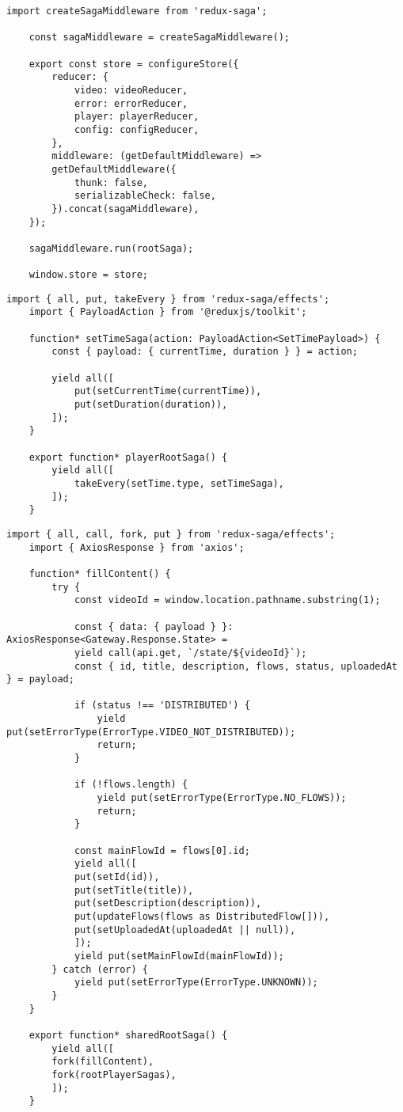 \begin{lstlisting}[caption={store.ts}]
	import createSagaMiddleware from 'redux-saga';
	
	const sagaMiddleware = createSagaMiddleware();
	
	export const store = configureStore({
		reducer: {
			video: videoReducer,
			error: errorReducer,
			player: playerReducer,
			config: configReducer,
		},
		middleware: (getDefaultMiddleware) =>
		getDefaultMiddleware({
			thunk: false,
			serializableCheck: false,
		}).concat(sagaMiddleware),
	});
	
	sagaMiddleware.run(rootSaga);
	
	window.store = store;
\end{lstlisting}

\begin{lstlisting}[caption={player/sagas.ts}]
	import { all, put, takeEvery } from 'redux-saga/effects';
	import { PayloadAction } from '@reduxjs/toolkit';
	
	function* setTimeSaga(action: PayloadAction<SetTimePayload>) {
		const { payload: { currentTime, duration } } = action;    
		
		yield all([
			put(setCurrentTime(currentTime)),
			put(setDuration(duration)),
		]);
	}
	
	export function* playerRootSaga() {
		yield all([
			takeEvery(setTime.type, setTimeSaga),
		]);
	}
\end{lstlisting}

\begin{lstlisting}[caption={shared/sagas.ts}]
	import { all, call, fork, put } from 'redux-saga/effects';
	import { AxiosResponse } from 'axios';
	
	function* fillContent() {
		try {
			const videoId = window.location.pathname.substring(1);
			
			const { data: { payload } }: AxiosResponse<Gateway.Response.State> =
			yield call(api.get, `/state/${videoId}`);
			const { id, title, description, flows, status, uploadedAt } = payload;
			
			if (status !== 'DISTRIBUTED') {
				yield put(setErrorType(ErrorType.VIDEO_NOT_DISTRIBUTED));
				return;
			}
			
			if (!flows.length) {
				yield put(setErrorType(ErrorType.NO_FLOWS));
				return;
			}
			
			const mainFlowId = flows[0].id;
			yield all([
			put(setId(id)),
			put(setTitle(title)),
			put(setDescription(description)),
			put(updateFlows(flows as DistributedFlow[])),
			put(setUploadedAt(uploadedAt || null)),
			]);
			yield put(setMainFlowId(mainFlowId));
		} catch (error) {
			yield put(setErrorType(ErrorType.UNKNOWN));
		}
	}
	
	export function* sharedRootSaga() {
		yield all([
		fork(fillContent),
		fork(rootPlayerSagas),
		]);
	}
\end{lstlisting}

